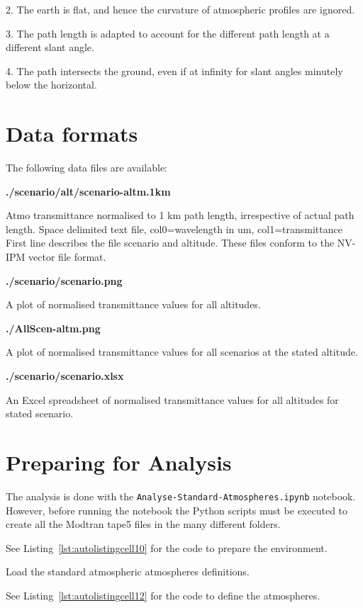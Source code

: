 \documentclass{workpackage}
\begin{document}
 2. The earth is flat, and hence the curvature of atmospheric profiles are ignored.  


 3. The path length is adapted to account for the different path length at a different slant angle.


 4. The path intersects the ground, even if at infinity for slant angles minutely below the horizontal.



\section{Data formats}
\label{sec:Dataformats}


The following data files are available:


\textbf{./scenario/alt/scenario-altm.1km} 


Atmo transmittance normalised to 1 km path length, irrespective of actual path length.
Space delimited text file, col0=wavelength in um, col1=transmittance
First line describes the file scenario and altitude. 
These files conform to the NV-IPM vector file format.


\textbf{./scenario/scenario.png}


A plot of normalised transmittance values for all altitudes.


\textbf{./AllScen-altm.png}


A plot of normalised transmittance values for all scenarios at the stated altitude.


\textbf{./scenario/scenario.xlsx}


An Excel spreadsheet of normalised transmittance values for all altitudes for stated scenario.


\section{Preparing for Analysis}
\label{sec:PreparingforAnalysis}

The analysis is done with the  \lstinline{Analyse-Standard-Atmospheres.ipynb} notebook. 
However, before running the notebook the Python scripts must be executed to create all the Modtran tape5 files in the many different folders.

See Listing~\ref{lst:autolistingcell10} for the code to prepare the environment.

Load the standard atmospheric atmospheres definitions.




See Listing~\ref{lst:autolistingcell12} for the code to define the atmospheres.
\end{document}
